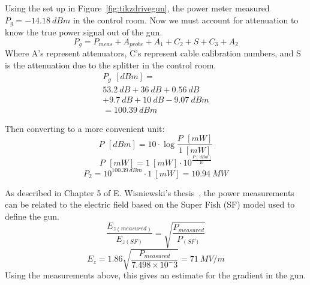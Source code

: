 Using the set up in Figure~\ref{fig:tikzdrivegun}, the power meter measured  $P_{g} = \SI{-14.18}{dBm}$
in the control room. Now we must account for attenuation to know the true power
signal out of the gun. 
\begin{equation}
P_g =P_{meas} + A_{probe}+A_1 + C_2 + S + C_3 + A_2 
\end{equation}
Where A's represent attenuators, C's represent cable calibration numbers, 
and S is the attenuation due to the splitter in the control room.
\begin{equation*}
\begin{aligned}
P_g \, \SI{}{[dBm]} = \\
\SI{53.2}{dB} + \SI{36}{dB} + \SI{0.56}{dB} \\
 + \SI{9.7}{dB}+ \SI{10}{dB} - \SI{9.07}{dBm} \\
 = \SI{100.39}{dBm} 
\end{aligned}
\end{equation*}

Then converting to a more convenient unit: 
\begin{equation}
P \, \SI{}{[dBm]} = 10 \cdot \log{\frac{P \, \SI{}{[mW]}}{\SI{1}{[mW]}}}
\end{equation}
\begin{equation} \label{eq:dbmtomw}
P \, \SI{}{[mW]} = \SI{1}{[mW]} \cdot 10^{\frac{P \, [\SI{}{dBm}]}{\SI{10}{}}}
\end{equation}
\begin{equation} 
P_2 = 10^{\SI{100.39}{dBm}} \cdot  \SI{1}{[mW]} = \SI{10.94}{MW} 
\end{equation}


As described in Chapter 5 of E. Wisniewski's thesis~\cite{eric}, 
the power measurements can be related to the electric field 
based on the Super Fish (SF) \cite{superfish} model used to define the gun.
\begin{equation}
	\frac{E_{z \left(measured\right)}}{E_{z(SF)}} = \sqrt{\frac{P_{measured}}{P_{(SF)}}}
\end{equation}
\begin{equation}
	E_z = 1.86\sqrt{\frac{P_{measured}}{7.498\times10^-3}} = \SI{71}{MV/m}
\end{equation}
Using the measurements above, this gives an estimate for the gradient in the gun.


